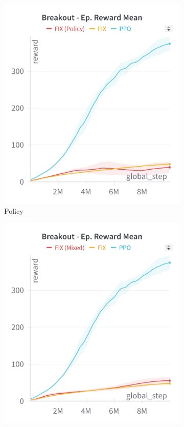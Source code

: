 \begin{figure}[ht]
    \centering
    \begin{subfigure}[b]{0.32\textwidth}
        \centering
        \includegraphics[width=\textwidth]{images/breakout_fix_policy}
        \caption{Policy}
        \label{fig:breakout_fix_policy}
    \end{subfigure}
    \hfill
    \begin{subfigure}[b]{0.32\textwidth}
        \centering
        \includegraphics[width=\textwidth]{images/breakout_fix_mixed}

\end{subfigure}
\end{figure}
